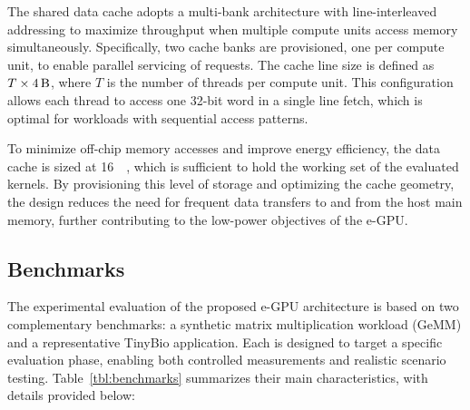             The shared data cache adopts a multi-bank architecture with line-interleaved addressing to maximize throughput when multiple compute units access memory simultaneously. Specifically, two cache banks are provisioned, one per compute unit, to enable parallel servicing of requests. The cache line size is defined as $T \times \SI{4}{\byte}$, where $T$ is the number of threads per compute unit. This configuration allows each thread to access one 32-bit word in a single line fetch, which is optimal for workloads with sequential access patterns.
        
            To minimize off-chip memory accesses and improve energy efficiency, the data cache is sized at \SI{16}{\kibi\byte}, which is sufficient to hold the working set of the evaluated kernels. By provisioning this level of storage and optimizing the cache geometry, the design reduces the need for frequent data transfers to and from the host main memory, further contributing to the low-power objectives of the \mbox{e-GPU}.

        \subsection{Benchmarks} 
        \label{sec:kernels}
            
            The experimental evaluation of the proposed \mbox{e-GPU} architecture is based on two complementary benchmarks: a synthetic matrix multiplication workload (GeMM) and a representative TinyBio application. Each is designed to target a specific evaluation phase, enabling both controlled measurements and realistic scenario testing. Table~\ref{tbl:benchmarks} summarizes their main characteristics, with details provided below:

